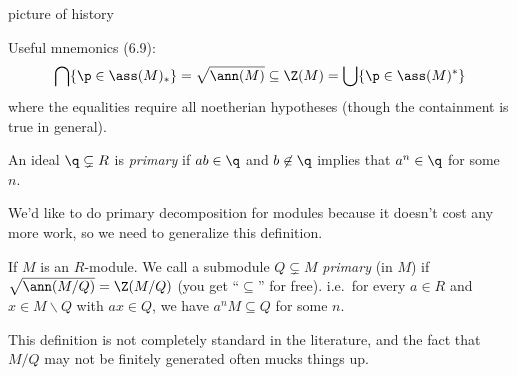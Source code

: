  picture of history

 Useful mnemonics (6.9):
 \[
  \bigcap \{\p\in \ass (M)_*\} = \sqrt{\ann (M)} \subseteq   \Z(M) =
  \bigcup \{\p\in \ass (M)^*\}
 \]
 where the equalities require all noetherian hypotheses (though the containment is true
 in general).
 \begin{definition}[Lasker, 1905]
   An ideal $\q\subsetneq R$ is \emph{primary} if $ab\in \q$ and $b\not\in \q$ implies
   that $a^n\in \q$ for some $n$.
 \end{definition}
 We'd like to do primary decomposition for modules because it doesn't cost any more work,
 so we need to generalize this definition.
 \begin{definition}
   If $M$ is an $R$-module. We call a submodule $Q\subsetneq M$ \emph{primary} (in $M$) if
   $\sqrt{\ann (M/Q)}= \Z(M/Q)$ (you get ``$\subseteq$'' for free). i.e.\ for every $a\in
   R$ and $x\in M\smallsetminus Q$ with $ax\in Q$, we have $a^n M\subseteq Q$ for some
   $n$.
 \end{definition}
 \begin{warning}
   This definition is not completely standard in the literature, and the fact that $M/Q$
   may not be finitely generated often mucks things up.
 \end{warning}

